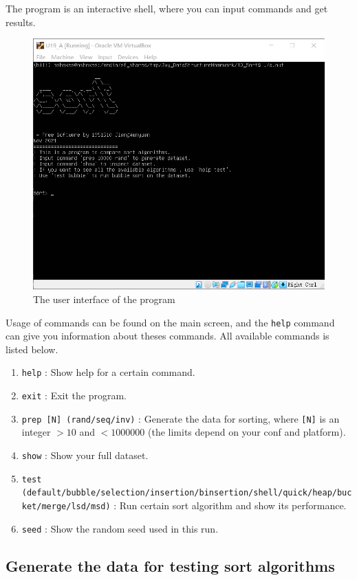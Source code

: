 \documentclass[cn,black,12pt,normal]{elegantnote}
\begin{document}
The program is an interactive shell, where you can input commands and get results.

\begin{figure}[H]
    \centering
    \includegraphics[width=0.7\linewidth]{image/sort_01.jpg}
    \caption{The user interface of the program}
\end{figure}

Usage of commands can be found on the main screen, and the \lstinline{help} command can give you information about theses commands.  All available commands is listed below.

\begin{enumerate}
    \item \lstinline{help} : Show help for a certain command.
    \item \lstinline{exit} : Exit the program.
    \item \lstinline{prep [N] (rand/seq/inv)} : Generate the data for sorting, where \lstinline{[N]} is an integer $> 10$ and $< 1000000$ (the limits depend on your conf and platform).
    \item \lstinline{show} : Show your full dataset.
    \item \lstinline{test (default/bubble/selection/insertion/binsertion/shell/quick/heap/bucket/merge/lsd/msd)} : Run certain sort algorithm and show its performance.
    \item \lstinline{seed} : Show the random seed used in this run.
\end{enumerate}

\subsection{Generate the data for testing sort algorithms}
\end{document}
